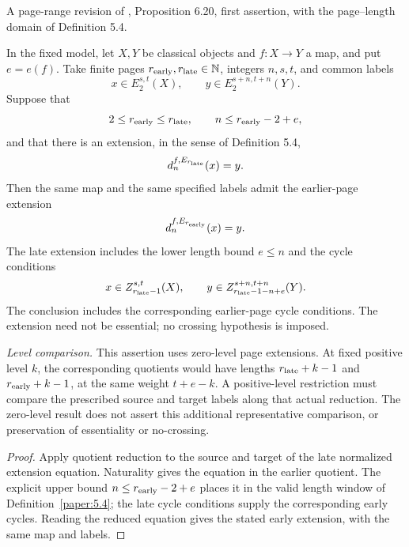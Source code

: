 \begin{theorem}
\label{sem:ProofTools:finite-extension-descent}
A page-range revision of \cite{LWX126}, Proposition 6.20, first assertion, with the page--length domain of Definition 5.4.\par

In the fixed model, let $X,Y$ be classical objects and $f:X\to Y$ a map, and put $e=e(f)$. Take finite pages $r_{\rm early},r_{\rm late}\in\mathbb N$, integers $n,s,t$, and common labels
\[
x\in E_2^{s,t}(X),\qquad y\in E_2^{s+n,t+n}(Y).
\]
Suppose that
\[
2\leq r_{\rm early}\leq r_{\rm late},\qquad
n\leq r_{\rm early}-2+e,
\]
and that there is an extension, in the sense of Definition 5.4,
\[
d_n^{f,E_{r_{\rm late}}}(x)=y.
\]
Then the same map and the same specified labels admit the earlier-page extension
\[
d_n^{f,E_{r_{\rm early}}}(x)=y.
\]
The late extension includes the lower length bound $e\leq n$ and the cycle conditions
\[
x\in Z_{r_{\rm late}-1}^{s,t}(X),\qquad
y\in Z_{r_{\rm late}-1-n+e}^{s+n,t+n}(Y).
\]
The conclusion includes the corresponding earlier-page cycle conditions. The extension need not be essential; no crossing hypothesis is imposed.

\textit{Level comparison.}
This assertion uses zero-level page extensions. At fixed positive
level $k$, the corresponding quotients would have lengths
$r_{\rm late}+k-1$ and $r_{\rm early}+k-1$, at the same weight
$t+e-k$. A positive-level restriction must compare the prescribed
source and target labels along that actual reduction. The zero-level
result does not assert this additional representative comparison,
or preservation of essentiality or no-crossing.
\end{theorem}
\begin{proof}
Apply quotient reduction to the source and target of the late normalized extension equation. Naturality gives the equation in the earlier quotient. The explicit upper bound $n\le r_{\rm early}-2+e$ places it in the valid length window of Definition~\ref{paper:5.4}; the late cycle conditions supply the corresponding early cycles. Reading the reduced equation gives the stated early extension, with the same map and labels.
\end{proof}



